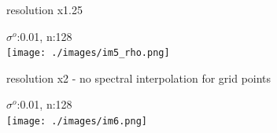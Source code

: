 \documentclass[francais]{beamer}
\begin{document}
\begin{frame}{resolution x1.25}
\begin{center}
$\sigma^o$:0.01, n:128\\
 \texttt{[image: ./images/im5\_rho.png]}
\end{center}
\end{frame}



\begin{frame}{resolution x2 - no spectral interpolation for grid points}
\begin{center}
$\sigma^o$:0.01, n:128\\
 \texttt{[image: ./images/im6.png]}
\end{center}
\end{frame}




\usebackgroundtemplate{}
\end{document}
